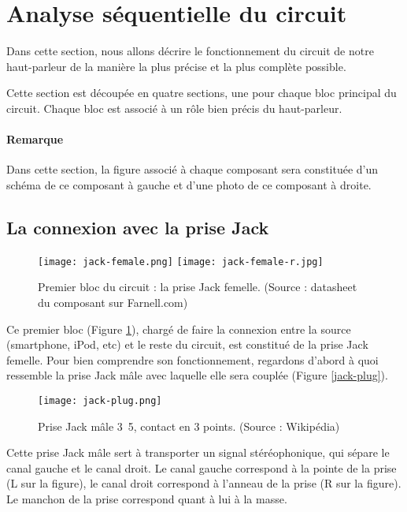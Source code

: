 

\section{Analyse séquentielle du circuit}
Dans cette section, nous allons décrire le fonctionnement du circuit
de notre haut-parleur de la manière la plus précise et la plus complète
possible. 

Cette section est découpée en quatre sections, une pour chaque bloc 
principal du circuit. Chaque bloc est associé à un rôle bien précis du
haut-parleur.

\paragraph{Remarque}
Dans cette section, la figure associé à chaque composant sera constituée
d'un schéma de ce composant à gauche et d'une photo de ce composant à droite.

\subsection{La connexion avec la prise Jack}

\begin{figure}[!hbt]
	\centering
	\texttt{[image: jack-female.png]}
	\texttt{[image: jack-female-r.jpg]}
	\caption{Premier bloc du circuit :
					la prise Jack femelle. (Source : datasheet du composant sur Farnell.com)}
	\label{jack-female}
\end{figure}

Ce premier bloc (Figure \ref{jack-female}), chargé de faire la connexion 
entre la source (smartphone, iPod, etc) et le reste du circuit, est constitué de la prise Jack femelle. 
Pour bien comprendre son fonctionnement, regardons d'abord à quoi ressemble la prise Jack
mâle avec laquelle elle sera couplée (Figure \ref{jack-plug}).

\begin{figure}[!hbt]
	\centering
	\texttt{[image: jack-plug.png]}
	\caption{Prise Jack mâle \unit{3.5}{\milli\meter}, contact en 3 points. (Source : Wikipédia)}
	\label{Jack-plug}
\end{figure}

Cette prise Jack mâle sert à transporter un signal stéréophonique, qui sépare le 
canal gauche et le canal droit. Le canal gauche correspond à la pointe de la prise 
(L sur la figure), le canal droit correspond à l'anneau de la prise (R sur la figure). 
Le manchon de la prise correspond quant à lui à la masse.


